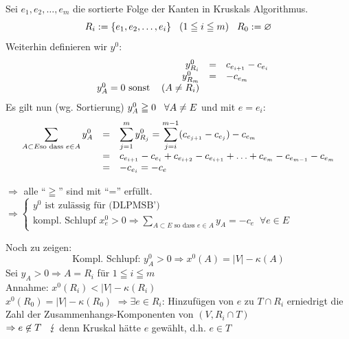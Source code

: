 Sei $e_{1}, e_{2}, \ldots, e_{m}$ die sortierte Folge der Kanten in
Kruskals Algorithmus.
\[ R_{i} := \{ e_{1}, e_{2}, \ldots, e_{i}\} \hspace{3mm} (1 \leqq i \leqq
m) \hspace{3mm} R_{0} := \varnothing \]
Weiterhin definieren wir $y^{0}$:
\[\begin{array}{rcl}
y^{0}_{R_{i}} &=& c_{e_{i+1}} - c_{e_{i}}\\
y^{0}_{R_{m}} &=& -c_{e_{m}} \hspace{3mm} \\ \hspace{3mm} y_{A}^{0} = 0 
\mbox{ sonst } \hspace{3mm} (A \not=R_{i})
\end{array}\]
Es gilt nun (wg. Sortierung) $y_{A}^{0} \geqq 0 \hspace{3mm} \forall
A \not= E$ und mit $e=e_{i}$:
\[\begin{array}{rcl}
\displaystyle \sum_{A \subset E \mbox{\scriptsize  so 
dass } e \in A} y^{0}_{A} &=& \displaystyle \sum^{m}_{j=1} y^{0}_{R_{j}} =
\sum^{m-1}_{j=i} (c_{e_{j+1}} - c_{e_{j}}) - c_{e_{m}}\\
&=& c_{e_{i+1}} - c_{e_{i}} + c_{e_{i+2}} -  c_{e_{i+1}} + \ldots
+  c_{e_{m}} -  c_{e_{m-1}} - c_{e_{m}}\\
&=& -c_{e_ {i}} = - c_{e} \end{array}
\]

$\Rightarrow$ alle "`$\geqq$"' sind mit "`="' erfüllt.\\
$\Rightarrow \left\{ \begin{array}{l}y^{0} \mbox{ ist zulässig für
(DLPMSB')}\\
\mbox{kompl. Schlupf $x_{e}^{0} > 0 \Rightarrow \displaystyle \sum_{A
\subset E \mbox{ so dass } e \in A} y_{A} = -c_{e} \; \; \forall e \in E$}
\end{array}\right.$

Noch zu zeigen:
\[\mbox{Kompl. Schlupf: } y_{A}^{0} > 0 \Rightarrow x^{0}(A) = | V | -
\kappa(A)\]
Sei $y_{A} > 0 \Rightarrow A = R_{i}$ für $1\leqq i \leqq m$\\
Annahme: $x^{0} (R_{i}) < |V| - \kappa(R_{i})$\\
$x^{0} (R_{0}) = |V| - \kappa(R_{0})$ 
$\Rightarrow \exists e \in R_{i}$: Hinzufügen von $e$ zu $T \cap R_{i}$
erniedrigt die Zahl der Zusammenhangs-Komponenten von $(V,R_{i} \cap T)$\\
$\Rightarrow e \not \in T \hspace{3mm} \lightning$ denn Kruskal hätte $e$
gewählt, d.h. $e \in T$

